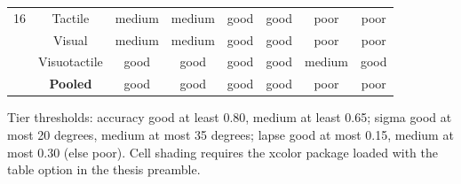 \begin{longtable}{lccccccc}
16 & Tactile & \cellcolor{yellow!25}medium & \cellcolor{yellow!25}medium & \cellcolor{green!15}good & \cellcolor{green!15}good & \cellcolor{red!15}poor & \cellcolor{red!15}poor \\
 & Visual & \cellcolor{yellow!25}medium & \cellcolor{yellow!25}medium & \cellcolor{green!15}good & \cellcolor{green!15}good & \cellcolor{red!15}poor & \cellcolor{red!15}poor \\
 & Visuotactile & \cellcolor{green!15}good & \cellcolor{green!15}good & \cellcolor{green!15}good & \cellcolor{green!15}good & \cellcolor{yellow!25}medium & \cellcolor{green!15}good \\
\textbf{} & \textbf{Pooled} & \cellcolor{green!15}good & \cellcolor{green!15}good & \cellcolor{green!15}good & \cellcolor{green!15}good & \cellcolor{red!15}poor & \cellcolor{red!15}poor \\
\end{longtable}
\vspace{4pt}
\par\noindent
\begin{minipage}{\linewidth}\small Tier thresholds: accuracy good at least 0.80, medium at least 0.65; sigma good at most 20 degrees, medium at most 35 degrees; lapse good at most 0.15, medium at most 0.30 (else poor). Cell shading requires the xcolor package loaded with the table option in the thesis preamble.\end{minipage}